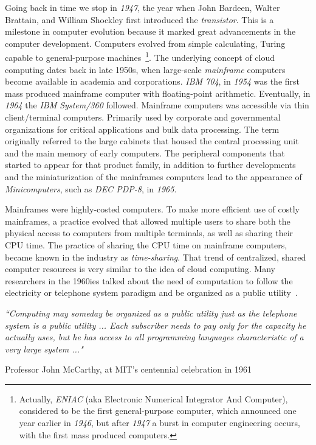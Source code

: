 Going back in time we stop in \emph{1947}, the year when John Bardeen, Walter
Brattain, and William Shockley first introduced the \emph{transistor}. This is a
milestone in computer evolution because it marked great advancements in the
computer development. Computers evolved from simple calculating, Turing capable
to general-purpose machines~\footnote{Actually, \emph{ENIAC} (aka
Electronic Numerical Integrator And Computer), considered to be the first
general-purpose computer, which announced one year earlier in \emph{1946}, but
after \emph{1947} a burst in computer engineering occurs, with the first mass
produced computers.}. The underlying concept of cloud computing dates back in
late 1950s, when large-scale \emph{mainframe} computers become available in
academia and corporations. \emph{IBM 704}, in \emph{1954} was the first mass
produced mainframe computer with floating-point arithmetic. Eventually, in
\emph{1964} the \emph{IBM System/360} followed. Mainframe computers was
accessible via thin client/terminal computers. Primarily used by corporate
and governmental organizations for critical applications and bulk data
processing. The term originally referred to the large cabinets that housed the
central processing unit and the main memory of early computers. The peripheral
components that started to appear for that product family, in addition to
further developments and the miniaturization of the mainframes computers lead to
the appearance of \emph{Minicomputers}, such as \emph{DEC PDP-8}, in
\emph{1965}.

Mainframes were highly-costed computers. To make more efficient use of costly
mainframes, a practice evolved that allowed multiple users to share both the
physical access to computers from multiple terminals, as well as sharing their
CPU time. The practice of sharing the CPU time on mainframe computers, became
known in the
industry as \emph{time-sharing}. That trend of centralized, shared computer
resources is very similar to the idea of cloud computing. Many researchers in
the 1960ies talked about the need of computation to follow the electricity or
telephone system paradigm and be organized as a public
utility~\cite{cloud_imperative}.

\newpage
\begin{flushright}
  \emph{``Computing may someday be organized as a public utility just as the
         telephone system is a public utility ... Each subscriber needs to pay
         only for the capacity he actually uses, but he has access to all
         programming languages characteristic of a very large system ..."}


   Professor John McCarthy, at MIT’s centennial celebration in 1961
\end{flushright}

